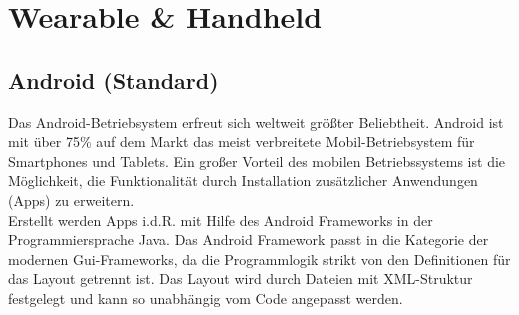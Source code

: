 \newpage
\section{Wearable \& Handheld} \label{sec:hauptteil_android}

\subsection{Android (Standard)}
Das Android-Betriebsystem erfreut sich weltweit größter Beliebtheit. Android ist mit über 75\% auf dem Markt das meist verbreitete Mobil-Betriebsystem für Smartphones und Tablets. Ein großer Vorteil des mobilen Betriebssystems ist die Möglichkeit, die Funktionalität durch Installation zusätzlicher Anwendungen (Apps) zu erweitern.
\\[0.5cm]
Erstellt werden Apps i.d.R. mit Hilfe des Android Frameworks in der Programmiersprache Java. Das Android Framework passt in die Kategorie der modernen Gui-Frameworks, da die Programmlogik strikt von den Definitionen für das Layout getrennt ist. Das Layout wird durch Dateien mit XML-Struktur festgelegt und kann so unabhängig vom Code angepasst werden.

